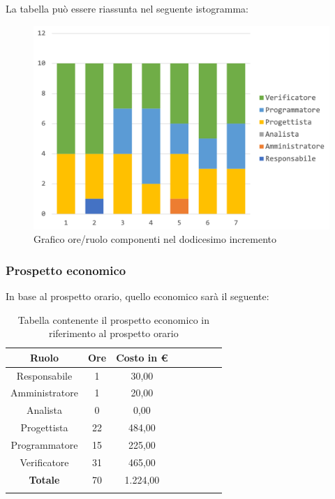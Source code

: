 		La tabella può essere riassunta nel seguente istogramma:
		\begin{figure}[H]
			\centering
			\includegraphics[width=0.8\linewidth]{./images/preventivo/incremento12-1.png}
			\caption{Grafico ore/ruolo componenti nel dodicesimo incremento}
			\label{fig:grafico suddivione ruoli incremento XII}
		\end{figure}
		
		\subsubsection{Prospetto economico}
		In base al prospetto orario, quello economico sarà il seguente: 
		
		\begin{longtable}{|c|c|c|c|c|c|c|c|}
			\hline
			\rowcolor{lighter-grayer}
			\textbf{Ruolo} & \textbf{Ore} & \textbf{Costo in € } \\
			\hline
			\endfirsthead
			
			\hline
			Responsabile 	    & 1 & 30,00\\
			\hline 
			\hline
			Amministratore	   & 1 & 20,00\\
			\hline
			\hline
			Analista 				& 0 & 0,00\\
			\hline
			\hline
			Progettista 		   & 22 & 484,00\\
			\hline
			\hline
			Programmatore 	  & 15 & 225,00\\
			\hline
			\hline
			Verificatore 		   & 31 & 465,00\\
			\hline
			\textbf{Totale} 	 & 70 & 1.224,00\\
			\hline
			\caption{Tabella contenente il prospetto economico in riferimento al prospetto orario}
		\end{longtable}
		\pagebreak
		
